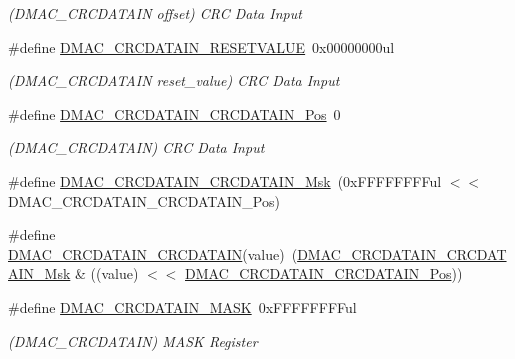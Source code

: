 \begin{DoxyCompactItemize}
\begin{DoxyCompactList}\small\item\em (D\+M\+A\+C\+\_\+\+C\+R\+C\+D\+A\+T\+A\+IN offset) C\+RC Data Input \end{DoxyCompactList}\item 
\#define \mbox{\hyperlink{group___s_a_m_d21___d_m_a_c_ga5534ffe7438beca32743f1f81709677f}{D\+M\+A\+C\+\_\+\+C\+R\+C\+D\+A\+T\+A\+I\+N\+\_\+\+R\+E\+S\+E\+T\+V\+A\+L\+UE}}~0x00000000ul
\begin{DoxyCompactList}\small\item\em (D\+M\+A\+C\+\_\+\+C\+R\+C\+D\+A\+T\+A\+IN reset\+\_\+value) C\+RC Data Input \end{DoxyCompactList}\item 
\#define \mbox{\hyperlink{group___s_a_m_d21___d_m_a_c_ga2713a15a580d2050de8cc774fdd40e3d}{D\+M\+A\+C\+\_\+\+C\+R\+C\+D\+A\+T\+A\+I\+N\+\_\+\+C\+R\+C\+D\+A\+T\+A\+I\+N\+\_\+\+Pos}}~0
\begin{DoxyCompactList}\small\item\em (D\+M\+A\+C\+\_\+\+C\+R\+C\+D\+A\+T\+A\+IN) C\+RC Data Input \end{DoxyCompactList}\item 
\#define \mbox{\hyperlink{group___s_a_m_d21___d_m_a_c_ga813549dfe6c707f8327c541b2b4991f8}{D\+M\+A\+C\+\_\+\+C\+R\+C\+D\+A\+T\+A\+I\+N\+\_\+\+C\+R\+C\+D\+A\+T\+A\+I\+N\+\_\+\+Msk}}~(0x\+F\+F\+F\+F\+F\+F\+F\+Ful $<$$<$ D\+M\+A\+C\+\_\+\+C\+R\+C\+D\+A\+T\+A\+I\+N\+\_\+\+C\+R\+C\+D\+A\+T\+A\+I\+N\+\_\+\+Pos)
\item 
\#define \mbox{\hyperlink{group___s_a_m_d21___d_m_a_c_ga6f7623c362034eb08c455c14471223a3}{D\+M\+A\+C\+\_\+\+C\+R\+C\+D\+A\+T\+A\+I\+N\+\_\+\+C\+R\+C\+D\+A\+T\+A\+IN}}(value)~(\mbox{\hyperlink{group___s_a_m_d21___d_m_a_c_ga813549dfe6c707f8327c541b2b4991f8}{D\+M\+A\+C\+\_\+\+C\+R\+C\+D\+A\+T\+A\+I\+N\+\_\+\+C\+R\+C\+D\+A\+T\+A\+I\+N\+\_\+\+Msk}} \& ((value) $<$$<$ \mbox{\hyperlink{group___s_a_m_d21___d_m_a_c_ga2713a15a580d2050de8cc774fdd40e3d}{D\+M\+A\+C\+\_\+\+C\+R\+C\+D\+A\+T\+A\+I\+N\+\_\+\+C\+R\+C\+D\+A\+T\+A\+I\+N\+\_\+\+Pos}}))
\item 
\#define \mbox{\hyperlink{group___s_a_m_d21___d_m_a_c_ga6900758cea6fa34414c3928274381515}{D\+M\+A\+C\+\_\+\+C\+R\+C\+D\+A\+T\+A\+I\+N\+\_\+\+M\+A\+SK}}~0x\+F\+F\+F\+F\+F\+F\+F\+Ful
\begin{DoxyCompactList}\small\item\em (D\+M\+A\+C\+\_\+\+C\+R\+C\+D\+A\+T\+A\+IN) M\+A\+SK Register \end{DoxyCompactList}\item 

\end{DoxyCompactItemize}

